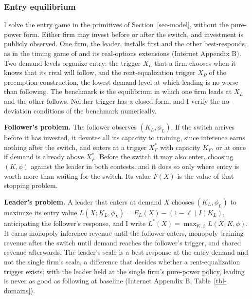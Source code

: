 \documentclass[
  11pt,
  letterpaper,
]{scrartcl}
\begin{document}
\subsubsection{Entry equilibrium}\label{entry-equilibrium}

I solve the entry game in the primitives of Section~\ref{sec-model},
without the pure-power form. Either firm may invest before or after the
switch, and investment is publicly observed. One firm, the leader,
installs first and the other best-responds, as in the timing game of
\citet{fudenberg1985preemption} and its real-options extensions
\citep{huisman2015strategic, pawlina2006real} (Internet Appendix B). Two
demand levels organize entry: the trigger \(X_L\) that a firm chooses
when it knows that its rival will follow, and the rent-equalization
trigger \(X_P\) of the preemption construction, the lowest demand level
at which leading is no worse than following. The benchmark is the
equilibrium in which one firm leads at \(X_L\) and the other follows.
Neither trigger has a closed form, and I verify the no-deviation
conditions of the benchmark numerically.

\textbf{Follower's problem.} The follower observes \((K_L, \phi_L)\). If
the switch arrives before it has invested, it devotes all its capacity
to training, since inference earns nothing after the switch, and enters
at a trigger \(X_F^*\) with capacity \(K_F\), or at once if demand is
already above \(X_F^*\). Before the switch it may also enter, choosing
\((K, \phi)\) against the leader in both contests, and it does so only
where entry is worth more than waiting for the switch. Its value
\(F(X)\) is the value of that stopping problem.

\textbf{Leader's problem.} A leader that enters at demand \(X\) chooses
\((K_L, \phi_L)\) to maximize its entry value
\(L(X; K_L, \phi_L) = E_L(X) - (1-\ell)I(K_L)\), anticipating the
follower's response, and I write
\(L^*(X) = \max_{K, \phi} L(X; K, \phi)\). It earns monopoly inference
revenue until the follower enters, monopoly training revenue after the
switch until demand reaches the follower's trigger, and shared revenue
afterwards. The leader's scale is a best response at the entry demand
and not the single firm's scale, a difference that decides whether a
rent-equalization trigger exists: with the leader held at the single
firm's pure-power policy, leading is never as good as following at
baseline (Internet Appendix B, Table~\ref{tbl-domains}).
\end{document}
